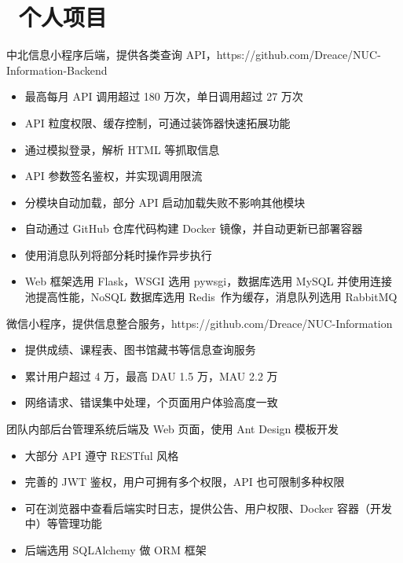 \documentclass{resume}
\begin{document}
\section{\faUsers\ 个人项目}
\begin{onehalfspacing}
  中北信息小程序后端，提供各类查询 API，https://github.com/Dreace/NUC-Information-Backend
  \begin{itemize}
    \item 最高每月 API 调用超过 180 万次，单日调用超过 27 万次
    \item API 粒度权限、缓存控制，可通过装饰器快速拓展功能
    \item 通过模拟登录，解析 HTML 等抓取信息
    \item API 参数签名鉴权，并实现调用限流
    \item 分模块自动加载，部分 API 启动加载失败不影响其他模块
    \item 自动通过 GitHub 仓库代码构建 Docker 镜像，并自动更新已部署容器
    \item 使用消息队列将部分耗时操作异步执行
    \item Web 框架选用 Flask，WSGI 选用 pywsgi，数据库选用 MySQL 并使用连接池提高性能，NoSQL 数据库选用 Redis\
          作为缓存，消息队列选用 RabbitMQ
  \end{itemize}
\end{onehalfspacing}

\begin{onehalfspacing}
  微信小程序，提供信息整合服务，https://github.com/Dreace/NUC-Information
  \begin{itemize}
    \item 提供成绩、课程表、图书馆藏书等信息查询服务
    \item 累计用户超过 4 万，最高 DAU 1.5 万，MAU 2.2 万
    \item 网络请求、错误集中处理，个页面用户体验高度一致
  \end{itemize}
\end{onehalfspacing}

\begin{onehalfspacing}
  团队内部后台管理系统后端及 Web 页面，使用 Ant Design 模板开发
  \begin{itemize}
    \item 大部分 API 遵守 RESTful 风格
    \item 完善的 JWT 鉴权，用户可拥有多个权限，API 也可限制多种权限
    \item 可在浏览器中查看后端实时日志，提供公告、用户权限、Docker 容器（开发中）等管理功能
    \item 后端选用 SQLAlchemy 做 ORM 框架
  \end{itemize}
\end{onehalfspacing}
\end{document}
